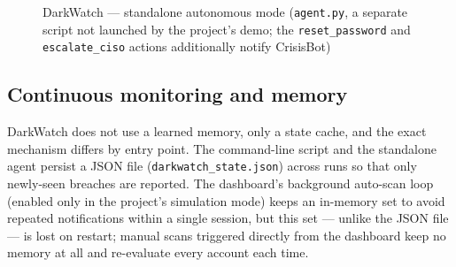 \documentclass[12pt,a4paper]{report}
\begin{document}
\begin{figure}[htbp]
\centering
{}
\caption[DarkWatch --- standalone autonomous mode]{DarkWatch --- standalone autonomous mode (\texttt{agent.py}, a separate script not launched by the project's demo; the \texttt{reset\_password} and \texttt{escalate\_ciso} actions additionally notify CrisisBot)}
\label{fig:darkwatch-pipeline-agent}
\end{figure}

\subsection*{Continuous monitoring and memory}
DarkWatch does not use a learned memory, only a state cache, and the exact mechanism differs by entry point. The command-line script and the standalone agent persist a JSON file (\texttt{darkwatch\_state.json}) across runs so that only newly-seen breaches are reported. The dashboard's background auto-scan loop (enabled only in the project's simulation mode) keeps an in-memory set to avoid repeated notifications within a single session, but this set --- unlike the JSON file --- is lost on restart; manual scans triggered directly from the dashboard keep no memory at all and re-evaluate every account each time.
\end{document}
